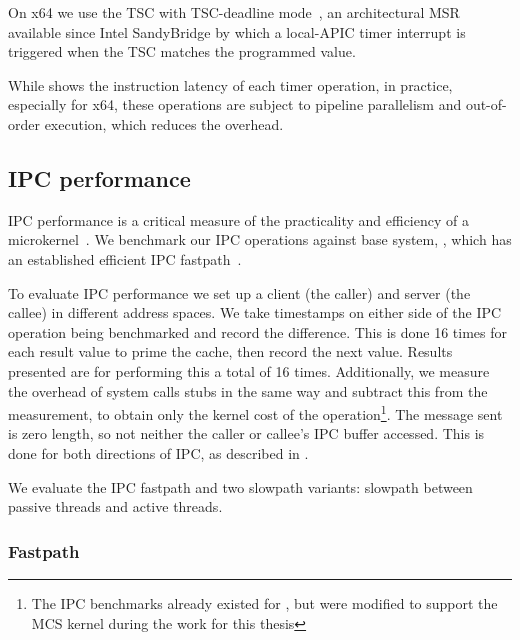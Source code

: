 On x64 we use the \gls{TSC} with \gls{TSC}-deadline mode~\citep{Intel_64_IA-32:asdmspg_325384}, an architectural \gls{MSR} available since
Intel SandyBridge by which a local-APIC timer interrupt is triggered when the \gls{TSC} matches the
programmed value. 

While  shows the instruction latency of each timer operation, in practice, especially
for x64, these operations are subject to pipeline parallelism and out-of-order execution, which
reduces the overhead.

\subsection{IPC performance}

\Gls{IPC} performance is a critical measure of the practicality and efficiency of a
microkernel~\citep{Liedtke_95}. We benchmark our \gls{IPC} operations against base system, \selfour,
which has an established efficient \gls{IPC} fastpath~\citep{Elphinstone_Heiser_13}. 

To evaluate IPC performance we set up a client (the caller) and server (the callee) in different
address spaces. We take
timestamps on either side of the IPC operation being benchmarked and record the difference. This is
done 16 times for each result value to prime the cache, then record the next value. Results
presented are for performing this a total of 16 times. Additionally, we measure the overhead of
system calls stubs in the same way and subtract this from the measurement, to obtain only the kernel
cost of the operation\footnote{The \gls{IPC} benchmarks already existed for \selfour, but were modified to
    support the \gls{MCS} kernel during the work for this thesis}. The message sent is zero length, so not
neither the caller or callee's \gls{IPC} buffer accessed.
This is done for both directions of IPC, as described in . 

We evaluate the \gls{IPC} fastpath and two slowpath variants: slowpath between passive threads and
active threads.

\subsubsection{Fastpath}

